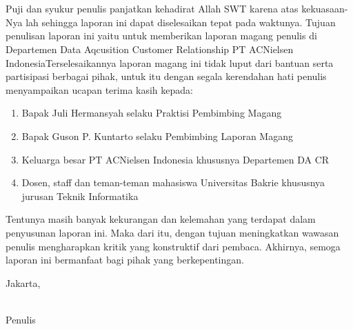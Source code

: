 \section*{}

Puji dan syukur penulis panjatkan kehadirat Allah SWT karena atas kekuasaan-Nya lah sehingga laporan ini dapat diselesaikan tepat pada waktunya. Tujuan penulisan laporan ini yaitu untuk memberikan laporan magang penulis di Departemen Data Aqcusition Customer Relationship PT ACNielsen IndonesiaTerselesaikannya laporan magang ini tidak luput dari bantuan serta partisipasi berbagai pihak, untuk itu dengan segala kerendahan hati penulis menyampaikan ucapan terima kasih kepada:

\begin{enumerate}
\item Bapak Juli Hermansyah selaku Praktisi Pembimbing Magang 
\item Bapak Guson P. Kuntarto selaku Pembimbing Laporan Magang
\item Keluarga besar PT ACNielsen Indonesia khususnya Departemen DA CR
\item Dosen, staff dan teman-teman mahasiswa Universitas Bakrie khususnya jurusan Teknik Informatika
\end{enumerate}
Tentunya masih banyak kekurangan dan kelemahan yang terdapat dalam penyusunan laporan ini. Maka dari itu, dengan tujuan meningkatkan wawasan penulis mengharapkan kritik yang konstruktif dari pembaca. Akhirnya, semoga laporan ini bermanfaat bagi pihak yang berkepentingan.\\[5ex]

\begin{flushright}
Jakarta, \date{\mydateformat \today}\\[5ex]
Penulis
\end{flushright}

